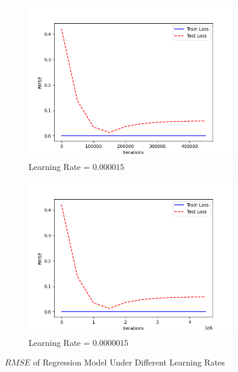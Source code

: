 \documentclass[a4paper, utf8]{ctexart}
\begin{document}
\begin{figure}[htbp]
		\begin{subfigure}{.48\textwidth}
			\centering
			\includegraphics[width=.9\linewidth]{./figure/1(b)5.png}
			\caption{Learning Rate = $0.000015$}
		\end{subfigure}
		\begin{subfigure}{.48\textwidth}
			\centering
			\includegraphics[width=.9\linewidth]{./figure/1(b)6.png}
			\caption{Learning Rate = $0.0000015$}
		\end{subfigure}
		\caption{$RMSE$ of Regression Model Under Different Learning Rates}
	\end{figure}
	
\end{document}
